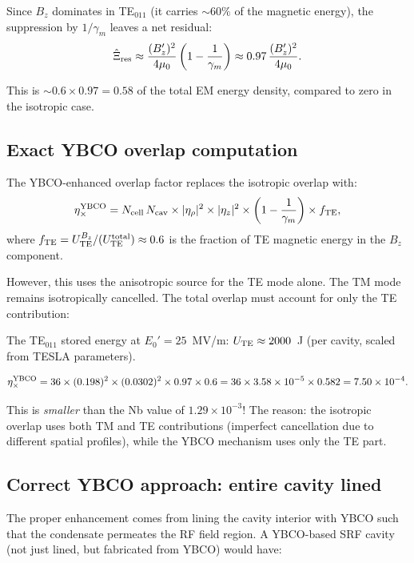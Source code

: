 \documentclass[11pt]{article}
\newcommand{\ee}[1]{\times 10^{#1}}
\begin{document}
Since $B_z$ dominates in TE$_{011}$ (it carries
$\sim 60\%$ of the magnetic energy), the suppression by $1/\gamma_m$
leaves a net residual:
\begin{equation}
\hat{\Xi}_{\rm res} \approx \frac{(B_z')^2}{4\mu_0}
\left(1 - \frac{1}{\gamma_m}\right)
\approx 0.97\,\frac{(B_z')^2}{4\mu_0}.
\end{equation}

This is $\sim 0.6 \times 0.97 = 0.58$ of the total EM energy density,
compared to zero in the isotropic case.

\subsection{Exact YBCO overlap computation}

The YBCO-enhanced overlap factor replaces the isotropic overlap with:
\begin{equation}
\eta_\times^{\rm YBCO} = N_{\rm cell}\,N_{\rm cav}
\times |\eta_\rho|^2 \times |\eta_z|^2
\times \left(1 - \frac{1}{\gamma_m}\right)
\times f_{\rm TE},
\end{equation}
where $f_{\rm TE} = U_{\rm TE}^{B_z}/(U_{\rm TE}^{\rm total})
\approx 0.6$ is the fraction of TE magnetic energy in the $B_z$
component.

However, this uses the anisotropic source for the TE mode alone.
The TM mode remains isotropically cancelled. The total overlap must
account for only the TE contribution:

The TE$_{011}$ stored energy at $E_0' = 25$~MV/m:
$U_{\rm TE} \approx 2000$~J (per cavity, scaled from TESLA parameters).

\begin{equation}
\eta_\times^{\rm YBCO} = 36 \times (0.198)^2 \times (0.0302)^2
\times 0.97 \times 0.6 = 36 \times 3.58\ee{-5} \times 0.582
= 7.50\ee{-4}.
\end{equation}

This is \emph{smaller} than the Nb value of $1.29\ee{-3}$!
The reason: the isotropic overlap uses both TM and TE
contributions (imperfect cancellation due to different spatial
profiles), while the YBCO mechanism uses only the TE part.

\subsection{Correct YBCO approach: entire cavity lined}

The proper enhancement comes from lining the cavity interior
with YBCO such that the condensate permeates the RF field region.
A YBCO-based SRF cavity (not just lined, but fabricated from YBCO)
would have:
\end{document}
